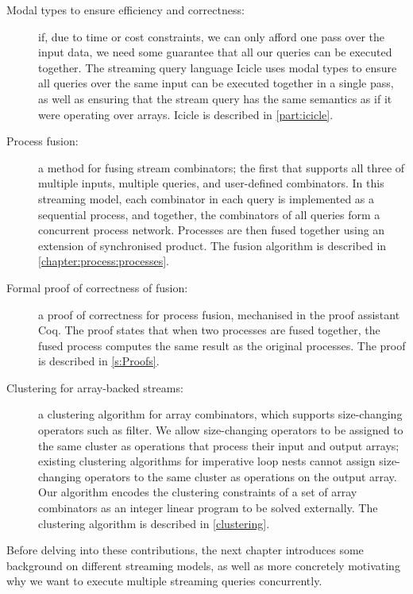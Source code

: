 \begin{description}
\item[Modal types to ensure efficiency and correctness:]
if, due to time or cost constraints, we can only afford one pass over the input data, we need some guarantee that all our queries can be executed together.
The streaming query language Icicle uses modal types to ensure all queries over the same input can be executed together in a single pass, as well as ensuring that the stream query has the same semantics as if it were operating over arrays.
Icicle is described in \cref{part:icicle}.


\item[Process fusion:]
a method for fusing stream combinators; the first that supports all three of multiple inputs, multiple queries, and user-defined combinators.
In this streaming model, each combinator in each query is implemented as a sequential process, and together, the combinators of all queries form a concurrent process network.
Processes are then fused together using an extension of synchronised product.
The fusion algorithm is described in \cref{chapter:process:processes}.

\item[Formal proof of correctness of fusion:]
a proof of correctness for process fusion, mechanised in the proof assistant Coq.
The proof states that when two processes are fused together, the fused process computes the same result as the original processes.
The proof is described in \cref{s:Proofs}.

\item[Clustering for array-backed streams:]
a clustering algorithm for array combinators, which supports size-changing operators such as filter.
We allow size-changing operators to be assigned to the same cluster as operations that process their input and output arrays; existing clustering algorithms for imperative loop nests cannot assign size-changing operators to the same cluster as operations on the output array.
Our algorithm encodes the clustering constraints of a set of array combinators as an integer linear program to be solved externally.
The clustering algorithm is described in \cref{clustering}.

\end{description}

Before delving into these contributions, the next chapter introduces some background on different streaming models, as well as more concretely motivating why we want to execute multiple streaming queries concurrently.


